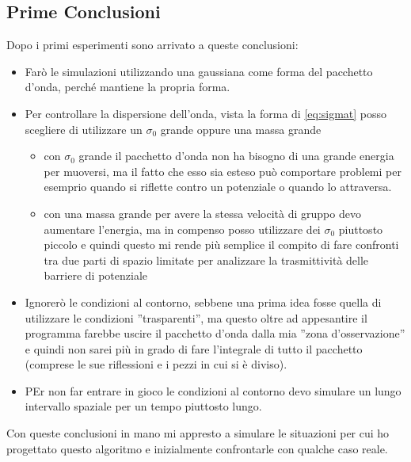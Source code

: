 \subsection{Prime Conclusioni}
Dopo i primi esperimenti sono arrivato a queste conclusioni:
\begin{itemize}
	\item Far\`o le simulazioni utilizzando una gaussiana come forma del pacchetto d'onda, perch\'e mantiene la propria forma.
	\item Per controllare la dispersione dell'onda, vista la forma di \eqref{eq:sigmat} posso scegliere di utilizzare un $\sigma_0$ grande oppure una massa grande
	\begin{itemize}
		\item con $\sigma_0$ grande il pacchetto d'onda  non ha bisogno di una grande energia per muoversi, ma il fatto che esso sia esteso pu\`o comportare problemi per esemprio quando si riflette contro un potenziale o quando lo attraversa.
		\item con una massa grande per avere la stessa velocit\`a di gruppo devo aumentare l'energia, ma in compenso posso utilizzare dei $\sigma_0$ piuttosto piccolo e quindi questo mi rende pi\`u semplice il compito di fare confronti tra due parti di spazio limitate per analizzare la trasmittivit\`a delle barriere di potenziale
	\end{itemize}
	\item Ignorer\`o le condizioni al contorno, sebbene una prima idea fosse quella di utilizzare le condizioni ''trasparenti'', ma questo oltre ad appesantire il programma farebbe uscire il pacchetto d'onda dalla mia ''zona d'osservazione'' e quindi non sarei pi\`u in grado di fare l'integrale di tutto il pacchetto (comprese le sue riflessioni e i pezzi in cui si \`e diviso).
	\item PEr non far entrare in gioco le condizioni al contorno devo simulare un lungo intervallo spaziale per un tempo piuttosto lungo.
\end{itemize}

Con queste conclusioni in mano mi appresto a simulare le situazioni per cui ho progettato questo algoritmo e inizialmente confrontarle con qualche caso reale.
